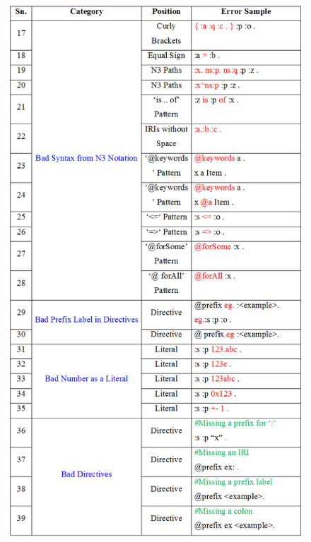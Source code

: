 \begin{appendices}
 \begin{figure}[H]
 	\centering
\includegraphics[width=5.5in]{images/bigTablePage3.png}
\end{figure}
 \begin{figure}[H]
 	\centering

\end{figure}
\end{appendices}

